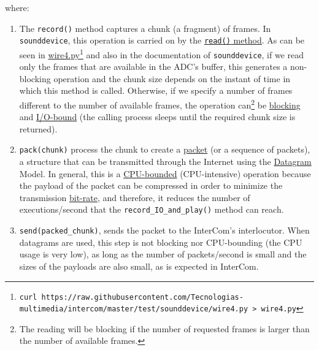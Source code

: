 where:

\begin{enumerate}
\item The \verb|record()| method captures a chunk (a fragment) of frames. In
  \verb|sounddevice|, this operation is carried on by the
  \href{https://python-sounddevice.readthedocs.io/en/0.4.0/api/streams.html#sounddevice.Stream.read}{\texttt{read()}
    method}. As can be seen in
  \href{https://raw.githubusercontent.com/Tecnologias-multimedia/intercom/master/test/sounddevice/wire4.py}{wire4.py}\footnote{
    \texttt{curl
      https://raw.githubusercontent.com/Tecnologias-multimedia/intercom/master/test/sounddevice/wire4.py
      > wire4.py}} and also in the documentation of
  \verb|sounddevice|, if we read only the frames that are available in
  the ADC's buffer, this generates a non-blocking operation and the
  chunk size depends on the instant of time in which this method is
  called. Otherwise, if we specify a number of frames different to
  the number of available frames, the operation can\footnote{The
    reading will be blocking if the number of requested frames is
    larger than the number of available frames.} be
  \href{https://python-sounddevice.readthedocs.io/en/0.4.0/api/streams.html#sounddevice.Stream.write}{blocking}
  and \href{https://en.wikipedia.org/wiki/I/O_bound}{I/O-bound} (the
  calling process sleeps until the required chunk size is returned).

\item \verb|pack(chunk)| process the chunk to create a
  \href{https://en.wikipedia.org/wiki/Network_packet}{packet} (or a
  sequence of packets), a structure that can be transmitted through
  the Internet using the
  \href{https://en.wikipedia.org/wiki/Datagram}{Datagram} Model. In
  general, this is a
  \href{https://en.wikipedia.org/wiki/CPU-bound}{CPU-bounded}
  (CPU-intensive) operation because the payload of the packet can be
  compressed in order to minimize the transmission
  \href{https://en.wikipedia.org/wiki/Bit_rate}{bit-rate}, and
  therefore, it reduces the number of executions/second that the
  \verb|record_IO_and_play()| method can reach.

\item \verb|send(packed_chunk)|, sends the packet to the
  InterCom's interlocutor. When datagrams are used, this step is
  not blocking nor CPU-bounding (the CPU usage is very low), as
  long as the number of packets/second is small and the sizes of the
  payloads are also small, as is expected in InterCom.


\end{enumerate}

